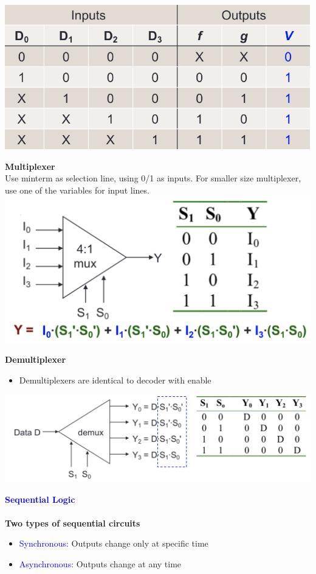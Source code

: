 \documentclass[a4paper]{article} \usepackage[backend=biber, style=numeric, sorting=none]{biblatex}
\begin{document}
\begin{multicols*}{4}
\begin{multicols*}{2}
\includegraphics[width=1\columnwidth]{priorityEncoder}
\end{multicols*}

\begin{multicols*}{2}
\textbf{{Multiplexer}}
\\ Use minterm as selection line, using 0/1 as inputs. For smaller size multiplexer, use one of the variables for input lines.
\vfill\null
\columnbreak
\includegraphics[width=1\columnwidth]{multiplexer}
\end{multicols*}
\columnbreak
\textbf{{Demultiplexer}}
\begin{itemize}
    \item Demultiplexers are identical to decoder with enable
\end{itemize}

\includegraphics[width=1\columnwidth]{demultiplexer}

{\small\textbf{\textcolor{blue}{Sequential Logic}}}
\\\\\textbf{{Two types of sequential circuits}}
\begin{itemize}
    \item \textcolor{blue}{Synchronous}: Outputs change only at specific time
    \item \textcolor{blue}{Asynchronous}: Outputs change at any time\\
\end{itemize}


\end{multicols*}
\end{document}
